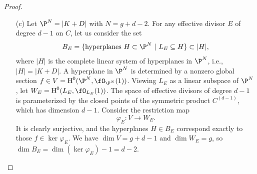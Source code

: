 \documentclass[a4paper]{article}
\begin{document}
\begin{enumerate} [label=\textbf{\arabic*.}, leftmargin=0em]
\begin{proof}
\begin{itemize} [leftmargin=0cm]
                        Now, if $\beta(\xi) = 0$, then we are done.
                        Otherwise, dualizing the column on the right of the commutative diagram gives
                        \[ \begin{tikzcd}
                                \cH^0(\fO(D + K - \tilde{E})) \arrow[d, "\psi^\vee"] \arrow[rd, "\tilde{\beta}^\vee"] &                 \\
                                \cH^0(\fO(D + K - E)) \arrow[r, "\beta^\vee"]                        & \cH^0(\fO(D+K))
                            \end{tikzcd}. \]
                        Thus, for every $\tilde{E}$, we have $L_{\tilde{E}} \subseteq L_E$.
                        By the assumption $\beta(\xi) \neq 0$, we have $L_E \nsubseteq H$, so $\im(\beta^\vee) \cap \ker(\xi)$ is a nonempty proper subspace of $\im(\beta^\vee)$.
                        By the Riemann-Roch theorem, we have
                        \begin{equation*}
                            \dim \cH^0(\fO(D + K - \tilde{E})) = g, \quad \dim \cH^0(\fO(D + K - E)) = g + m - 1.
                        \end{equation*}
                        The space of possible $\tilde{E}$ has dimension $m - 1$, so the image of $\psi^\vee$ as $\tilde{E}$ varies is dense inside $\cH^0(\fO(D + K - E))$.
                        Consequently, we can find at least one $\tilde{E}$ such that $\im(\tilde{\beta}^\vee) \nsubseteq \ker(\xi)$, which is what we wanted to show.

                  \item[(c)] Let $\P^N = |K + D|$ with $N = g + d - 2$.
                        For any effective divisor $E$ of degree $d - 1$ on $C$, let us consider the set
                        \begin{equation*}
                            B_E = \{ \text{hyperplanes $H \subset \P^N$ | $L_E \subseteq H$} \} \subset |H|,
                        \end{equation*}
                        where $|H|$ is the complete linear system of hyperplanes in $\P^N$, i.e., $|H| = |K + D|$.
                        A hyperplane in $\P^N$ is determined by a nonzero global section $f \in V = \cH^0(\P^N, \fO_{\P^N}(1))$.
                        Viewing $L_E$ as a linear subspace of $\P^N$, let $W_E = \cH^0(L_E, \fO_{L_E}(1))$.
                        The space of effective divisors of degree $d - 1$ is parameterized by the closed points of the symmetric product $C^{(d - 1)}$, which has dimension $d - 1$.
                        Consider the restriction map
                        \begin{equation*}
                            \varphi_E : V \to W_E.
                        \end{equation*}
                        It is clearly surjective, and the hyperplanes $H \in B_E$ correspond exactly to those $f \in \ker \varphi_E$.
                        We have $\dim{V} = g + d - 1$ and $\dim{W_E} = g$, so $\dim{B_E} = \dim(\ker{\varphi_E}) - 1 = d - 2$.


\end{itemize}
\end{proof}
\end{enumerate}
\end{document}
